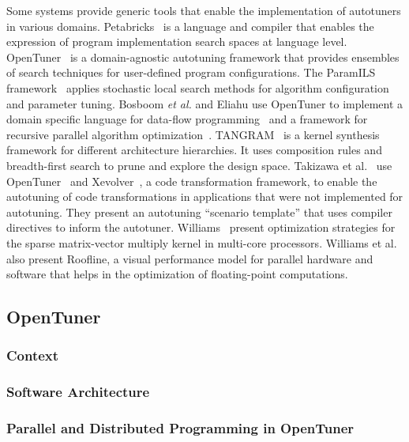 Some systems provide generic tools that enable the implementation of autotuners
in various domains.  Petabricks~\cite{ansel2009petabricks} is a language and
compiler that enables the expression of program implementation search spaces at
language level.  OpenTuner~\cite{ansel2014opentuner} is a domain-agnostic
autotuning framework that provides ensembles of search techniques for
user-defined program configurations.  The ParamILS
framework~\cite{hutter2009paramils} applies stochastic local search methods for
algorithm configuration and parameter tuning. Bosboom \emph{et al.} and Eliahu
use OpenTuner to implement a domain specific language for data-flow
programming~\cite{bosboom2014streamjit} and a framework for recursive parallel
algorithm optimization~\cite{eliahu2015frpa}.
TANGRAM~\cite{chang2015tangram,chang2016efficient} is a kernel synthesis
framework for different architecture hierarchies.  It uses composition rules
and breadth-first search to prune and explore the design space.  Takizawa et
al.~\cite{takizawa2017customizable} use OpenTuner~\cite{ansel2014opentuner} and
Xevolver~\cite{takizawa2014xevolver}, a code transformation framework, to
enable the autotuning of code transformations in applications that were not
implemented for autotuning. They present an autotuning ``scenario template''
that uses compiler directives to inform the autotuner.
Williams~\cite{williams2009optimization} present optimization strategies for
the sparse matrix-vector multiply kernel in multi-core processors.  Williams et
al.~\cite{williams2009roofline} also present Roofline, a visual performance
model for parallel hardware and software that helps in the optimization of
floating-point computations.

\subsection{OpenTuner}
\label{sec:opentuner}

\subsubsection{Context}
\label{sec:context}

\subsubsection{Software Architecture}
\label{sec:arch}

\subsubsection{Parallel and Distributed Programming in OpenTuner}
\label{sec:opentuner-parallel}

